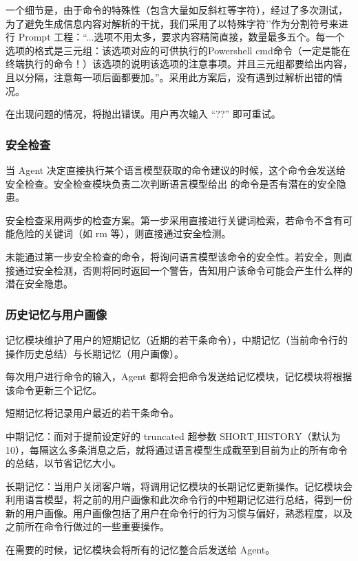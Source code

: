 \documentclass{article}
\theoremstyle{plain}
\theoremstyle{definition}
\theoremstyle{remark}
\begin{document}
一个细节是，由于命令的特殊性（包含大量如反斜杠等字符），经过了多次测试，为了避免生成信息内容对解析的干扰，我们采用了以特殊字符'{}'作为分割符号来进行 Prompt 工程：“...选项不用太多，要求内容精简直接，数量最多五个。每一个选项的格式是三元组：该选项对应的可供执行的Powershell cmd命令（一定是能在终端执行的命令！）{}该选项的说明{}该选项的注意事项{}。并且三元组都要给出内容，且以{}分隔，注意每一项后面都要加{}。”。采用此方案后，没有遇到过解析出错的情况。

在出现问题的情况，将抛出错误。用户再次输入 “??” 即可重试。

\subsubsection{安全检查}

当 Agent 决定直接执行某个语言模型获取的命令建议的时候，这个命令会发送给安全检查。安全检查模块负责二次判断语言模型给出 的命令是否有潜在的安全隐患。

安全检查采用两步的检查方案。第一步采用直接进行关键词检索，若命令不含有可能危险的关键词（如 rm 等），则直接通过安全检测。

未能通过第一步安全检查的命令，将询问语言模型该命令的安全性。若安全，则直接通过安全检测，否则将同时返回一个警告，告知用户该命令可能会产生什么样的潜在安全隐患。

\subsubsection{历史记忆与用户画像}

记忆模块维护了用户的短期记忆（近期的若干条命令），中期记忆（当前命令行的操作历史总结）与长期记忆（用户画像）。

每次用户进行命令的输入，Agent 都将会把命令发送给记忆模块，记忆模块将根据该命令更新三个记忆。

短期记忆将记录用户最近的若干条命令。

中期记忆：而对于提前设定好的 truncated 超参数 $\text{SHORT\_HISTORY}$（默认为 10），每隔这么多条消息之后，就将通过语言模型生成截至到目前为止的所有命令的总结，以节省记忆大小。

长期记忆：当用户关闭客户端，将调用记忆模块的长期记忆更新操作。记忆模块会利用语言模型，将之前的用户画像和此次命令行的中短期记忆进行总结，得到一份新的用户画像。用户画像包括了用户在命令行的行为习惯与偏好，熟悉程度，以及之前所在命令行做过的一些重要操作。

在需要的时候，记忆模块会将所有的记忆整合后发送给 Agent。
\end{document}
